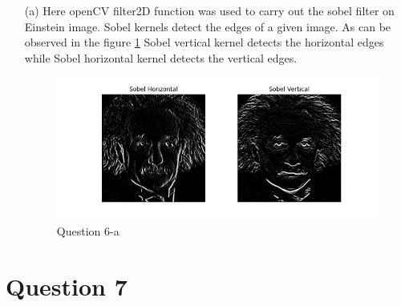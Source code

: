 \documentclass[11pt]{article}
\begin{document}
\begin{itemize}
    \item[(a)] Here openCV filter2D function was used to carry out the sobel filter on Einstein image. Sobel kernels detect the
            edges of a given image. As can be observed in the figure \ref{51} Sobel vertical kernel detects the horizontal edges while 
            Sobel horizontal kernel detects the vertical edges. 
    
    \begin{figure}[!h]
        \centering
        \includegraphics[width=\textwidth]{Images/51.jpg}
        \caption{Question 6-a}
        \label{51}
    \end{figure}
    
\end{itemize}

\section*{Question 7}
\end{document}
